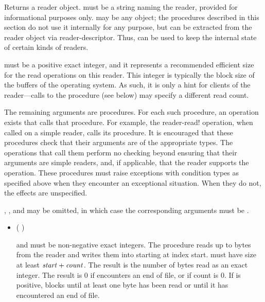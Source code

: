 \begin{entry}{%
}

Returns a reader object.  must be a string naming the reader,
provided for informational purposes only.  may be any
object; the procedures described in this section do not use it internally for any
purpose, but  can be extracted from the reader object via
{\cf reader-descriptor}. Thus,  can be used to keep the
internal state of certain kinds of readers.
   
 must be a positive exact integer, and it represents a recommended
efficient size for the read operations on this reader. This integer is typically the
block size of the buffers of the operating system. As such, it is only a
hint for clients of the reader---calls to the  procedure (see below)
may specify a different read count.

The remaining arguments are procedures.  For each such procedure, an
operation exists that calls that procedure.  For example, the {\cf
  reader-read!} operation, when called on a simple reader, calls
its  procedure.
It is encouraged that these procedures check that their arguments are
of the appropriate types.  The operations that call them perform
no checking beyond ensuring that their  arguments are
simple readers, and, if applicable, that the reader supports the operation.
These procedures must raise
exceptions with condition types as specified above when they encounter an
exceptional situation. When they do not, the effects are unspecified.

, , and  may be
omitted, in which case the corresponding arguments must be \schfalse.
   
\begin{itemize}
\item {\cf (   )}
       
   and  must be non-negative exact integers.
  The  procedure
  reads up to  bytes from the reader and writes them
  into  starting at index
  start.  must have size at least $\var{start} +
  \var{count}$. The result is the number of bytes read as an
  exact integer. The result is 0 if  encounters an end of file, or if
  count is 0. If  is positive,  blocks until at
  least one byte has been read or until it has encountered an end of file.
  

\end{itemize}
\end{entry}
